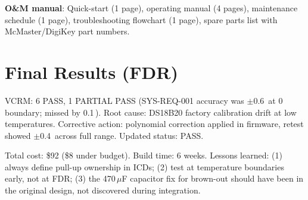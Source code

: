 \textbf{O\&M manual}: Quick-start (1 page), operating manual (4 pages), maintenance schedule (1 page), troubleshooting flowchart (1 page), spare parts list with McMaster/DigiKey part numbers.

\section*{Final Results (FDR)}
VCRM: 6 PASS, 1 PARTIAL PASS (SYS-REQ-001 accuracy was $\pm$0.6\,\degC{} at 0\,\degC{} boundary; missed by 0.1\,\degC{}). Root cause: DS18B20 factory calibration drift at low temperatures. Corrective action: polynomial correction applied in firmware, retest showed $\pm$0.4\,\degC{} across full range. Updated status: PASS.

Total cost: \$92 (\$8 under budget). Build time: 6 weeks. Lessons learned: (1) always define pull-up ownership in ICDs; (2) test at temperature boundaries early, not at FDR; (3) the 470\,$\mu$F capacitor fix for brown-out should have been in the original design, not discovered during integration.

